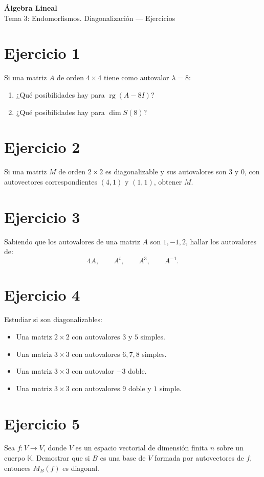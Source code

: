 \documentclass[11pt,a4paper]{article}
\newcommand{\K}{\mathbb{K}}
\newcommand{\rg}{\operatorname{rg}}
\begin{document}
\begin{center}
{\LARGE\bfseries Álgebra Lineal}\\[0.4em]
{\Large Tema 3: Endomorfismos. Diagonalización --- Ejercicios}
\end{center}

\section{Ejercicio 1}
Si una matriz $A$ de orden $4\times4$ tiene como autovalor $\lambda=8$:
\begin{enumerate}[label=\alph*)]
\item ¿Qué posibilidades hay para $\rg(A-8I)$?
\item ¿Qué posibilidades hay para $\dim S(8)$?
\end{enumerate}

\section{Ejercicio 2}
Si una matriz $M$ de orden $2\times2$ es diagonalizable y sus autovalores son $3$ y $0$, con autovectores correspondientes $(4,1)$ y $(1,1)$, obtener $M$.

\section{Ejercicio 3}
Sabiendo que los autovalores de una matriz $A$ son $1,-1,2$, hallar los autovalores de:
\[
4A,\qquad A^t,\qquad A^3,\qquad A^{-1}.
\]

\section{Ejercicio 4}
Estudiar si son diagonalizables:
\begin{itemize}
\item Una matriz $2\times2$ con autovalores $3$ y $5$ simples.
\item Una matriz $3\times3$ con autovalores $6,7,8$ simples.
\item Una matriz $3\times3$ con autovalor $-3$ doble.
\item Una matriz $3\times3$ con autovalores $9$ doble y $1$ simple.
\end{itemize}

\section{Ejercicio 5}
Sea $f:V\to V$, donde $V$ es un espacio vectorial de dimensión finita $n$ sobre un cuerpo $\K$. Demostrar que si $B$ es una base de $V$ formada por autovectores de $f$, entonces $M_B(f)$ es diagonal.
\end{document}
